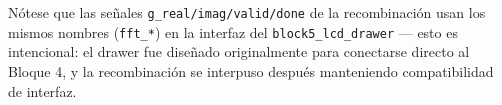 \documentclass[12pt, a4paper]{article}
\begin{document}
Nótese que las señales \texttt{g\_real/imag/valid/done} de la recombinación
usan los mismos nombres (\texttt{fft\_*}) en la interfaz del
\texttt{block5\_lcd\_drawer} — esto es intencional: el drawer fue diseñado
originalmente para conectarse directo al Bloque 4, y la recombinación se
interpuso después manteniendo compatibilidad de interfaz.
\end{document}
